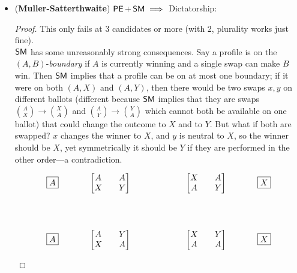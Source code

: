 \documentclass{amsart}
\DeclareMathOperator{\PE}{\sf{PE}}
\DeclareMathOperator{\SM}{\sf{SM}}
\begin{document}
\begin{itemize}
\begin{proof}
		Now suppose $S$ is decisive, $v\in S$, and $T=S\setminus \{v\}$. Suppose that $T$ is not decisive, so there is a profile for which $T$ ranks $A$ first, $v$ does not, and some other candidate $B$ wins. \textbf{not done}
	\end{proof}\\
	
	\item  (\textbf{Muller-Satterthwaite}) $\PE+\SM\implies$ Dictatorship:
	\begin{proof}
		This only fails at 3 candidates or more (with 2, plurality works just fine).\\
		
		$\SM$ has some unreasonably strong consequences. Say a profile is on the $(A,B)$-\textit{boundary} if $A$ is currently winning and a single swap can make $B$ win. Then $\SM$ implies that a profile can be on at most one boundary; if it were on both $(A,X)$ and $(A,Y)$, then there would be two swaps $x,y$ on different ballots (different because $\SM$ implies that they are swaps ${A\choose X}\to {X\choose A}$ and ${A\choose Y}\to {Y\choose A}$ which cannot both be available on one ballot) that could change the outcome to $X$ and to $Y$. But what if both are swapped? $x$ changes the winner to $X$, and $y$ is neutral to $X$, so the winner should be $X$, yet symmetrically it should be $Y$ if they are performed in the other order---a contradiction.
		$$
		\begin{tikzcd}
			{\boxed{A}} & \begin{array}{c} \begin{bmatrix}A & A \\ X & Y\end{bmatrix} \end{array} && \begin{array}{c} \begin{bmatrix}X & A \\ A & Y\end{bmatrix} \end{array} & {\boxed{X}} \\
			\\
			{\boxed{A}} & \begin{array}{c} \begin{bmatrix}A & Y \\ X & A\end{bmatrix} \end{array} && \begin{array}{c} \begin{bmatrix}X & Y \\ A & A\end{bmatrix} \end{array} & {\boxed{X}}

\end{tikzcd}$$
\end{proof}
\end{itemize}
\end{document}
